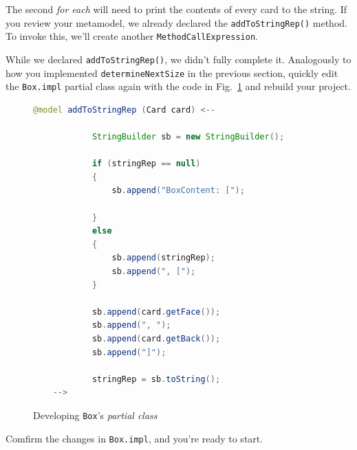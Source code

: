 \vspace{0.5cm}

The second \emph{for each} will need to print the contents of every card to the string. If you review your metamodel, we already declared the
\texttt{addToStringRep()} method. To invoke this, we'll create another \texttt{MethodCallExpression}.

\newpage

While we declared \texttt{addToStringRep()}, we didn't fully complete it. Analogously to how you implemented \texttt{determineNextSize} in the previous section,
quickly edit the \texttt{Box.impl} partial class again with the code in Fig.~\ref{code:addToStringRep_inject_file} and rebuild your project.

\vspace{1cm}

\begin{figure}[h!]
        \centering
        \begin{lstlisting}[language=Java, keywordstyle={\bfseries\color{purple}}, backgroundcolor=\color{white}]
    @model addToStringRep (Card card) <--

            StringBuilder sb = new StringBuilder();

            if (stringRep == null)
            {
                sb.append("BoxContent: [");

            }
            else
            {
                sb.append(stringRep);
                sb.append(", [");
            }

            sb.append(card.getFace());
            sb.append(", ");
            sb.append(card.getBack());
            sb.append("]");

            stringRep = sb.toString();
    -->
        \end{lstlisting}
        \caption{Developing \texttt{Box}'s \emph{partial class}}
        \label{code:addToStringRep_inject_file}
    \end{figure}
    \FloatBarrier

\vspace{1cm}

Comfirm the changes in \texttt{Box.impl}, and you're ready to start.





